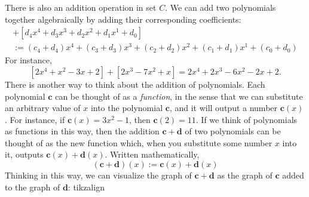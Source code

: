 \documentclass[a4paper,11pt]{book}
\theoremstyle{definition}
\newcommand{\be}{\begin{equation}}
\newcommand{\ee}{\end{equation}}
\newcommand{\ve}[1]{\mathbf{#1}}
\begin{document}
There is also an addition operation in set $C$. We can add two polynomials together algebraically by adding their corresponding coefficients:
\begin{multline}
  [c_4 x^4 + c_3 x^3 + c_2 x^2 + c_1 x^1 + c_0] + [d_4 x^4 + d_3 x^3 + d_2 x^2 + d_1 x^1 + d_0] \\
  := (c_4 + d_4) x^4 + (c_3 + d_3) x^3 + (c_2 + d_2) x^2 + (c_1 + d_1) x^1 + (c_0 + d_0) \label{add_in_C}
\end{multline}
For instance,
\[
[2x^4  + x^2 - 3x + 2] + [2x^3 - 7x^2 + x] 
= 2x^4 + 2x^3 - 6x^2 -2x + 2.
\]
There is another way to think about the addition of polynomials. Each polynomial $\ve{c}$ can be thought of as a {\em function}, in the sense that we can substitute an arbitrary value of $x$ into the polynomial $\ve{c}$, and it will output a number $\ve{c}(x)$. For instance, if $\ve{c}(x) = 3x^2 - 1$, then $\ve{c}(2) = 11$. If we think of polynomials as functions in this way, then the addition $\ve{c} + \ve{d}$ of two polynomials can be thought of as the new function which, when you substitute some number $x$ into it, outputs $\ve{c}(x) + \ve{d}(x)$. Written mathematically,
\be \label{add_in_C2}
  (\ve{c} + \ve{d})(x) := \ve{c}(x) + \ve{d}(x)
\ee
Thinking in this way, we can visualize the graph of $\ve{c} + \ve{d}$ as the graph of $\ve{c}$ added to the graph of $\ve{d}$:
tikzalign
\end{document}
